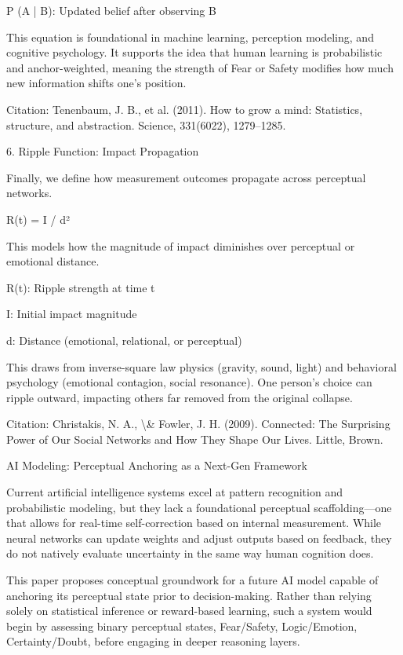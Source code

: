 \documentclass[12pt]{article}
\begin{document}
P (A | B): Updated belief after observing B

This equation is foundational in machine learning, perception modeling, and cognitive psychology. It supports the idea that human learning is probabilistic and anchor-weighted, meaning the strength of Fear or Safety modifies how much new information shifts one’s position.

Citation: Tenenbaum, J. B., et al. (2011). How to grow a mind: Statistics, structure, and abstraction. Science, 331(6022), 1279–1285.

6. Ripple Function: Impact Propagation

Finally, we define how measurement outcomes propagate across perceptual networks.

R(t) = I / d²

This models how the magnitude of impact diminishes over perceptual or emotional distance.

R(t): Ripple strength at time t

I: Initial impact magnitude

d: Distance (emotional, relational, or perceptual)

This draws from inverse-square law physics (gravity, sound, light) and behavioral psychology (emotional contagion, social resonance). One person’s choice can ripple outward, impacting others far removed from the original collapse.

Citation: Christakis, N. A., \textbackslash{}& Fowler, J. H. (2009). Connected: The Surprising Power of Our Social Networks and How They Shape Our Lives. Little, Brown.

AI Modeling: Perceptual Anchoring as a Next-Gen Framework

Current artificial intelligence systems excel at pattern recognition and probabilistic modeling, but they lack a foundational perceptual scaffolding—one that allows for real-time self-correction based on internal measurement. While neural networks can update weights and adjust outputs based on feedback, they do not natively evaluate uncertainty in the same way human cognition does.

This paper proposes conceptual groundwork for a future AI model capable of anchoring its perceptual state prior to decision-making. Rather than relying solely on statistical inference or reward-based learning, such a system would begin by assessing binary perceptual states, Fear/Safety, Logic/Emotion, Certainty/Doubt, before engaging in deeper reasoning layers.
\end{document}
